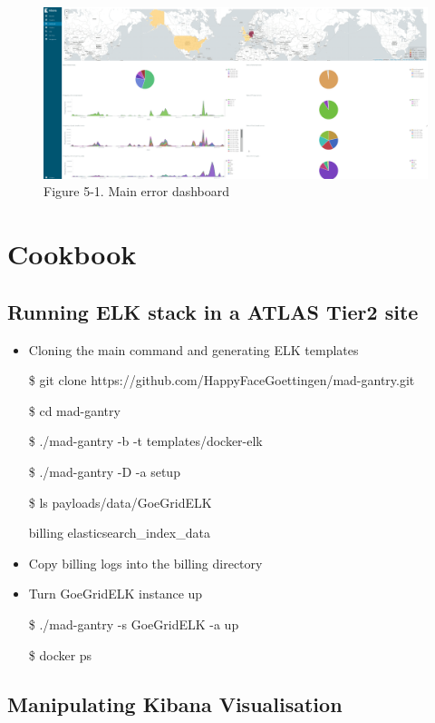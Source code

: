 \documentclass[]{article}
\begin{document}
\begin{figure}[htbp]
\centering
\includegraphics{images/kibana_error.png}
\caption{Figure 5-1. Main error dashboard}
\end{figure}

\section{Cookbook}\label{cookbook}

\subsection{Running ELK stack in a ATLAS Tier2
site}\label{running-elk-stack-in-a-atlas-tier2-site}

\begin{itemize}
\item
  Cloning the main command and generating ELK templates

  \$ git clone https://github.com/HappyFaceGoettingen/mad-gantry.git

  \$ cd mad-gantry

  \$ ./mad-gantry -b -t templates/docker-elk

  \$ ./mad-gantry -D -a setup

  \$ ls payloads/data/GoeGridELK

  billing elasticsearch\_index\_data
\item
  Copy billing logs into the billing directory
\item
  Turn GoeGridELK instance up

  \$ ./mad-gantry -s GoeGridELK -a up

  \$ docker ps
\end{itemize}

\subsection{Manipulating Kibana
Visualisation}\label{manipulating-kibana-visualisation}
\end{document}
